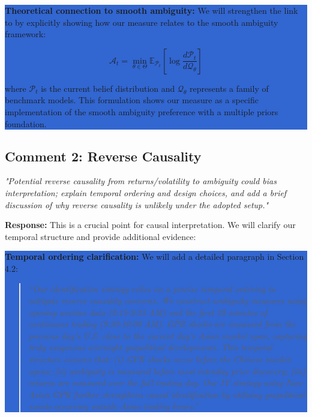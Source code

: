 \documentclass[12pt]{article}
\begin{document}
\colorbox{highlight}{\parbox{\dimexpr\linewidth-2\fboxsep}{%
\textbf{Theoretical connection to smooth ambiguity:} We will strengthen the link to \citet{Klibanoff2005} by explicitly showing how our measure relates to the smooth ambiguity framework:

\begin{equation}
\mathcal{A}_t = \min_{\theta \in \Theta} \mathbb{E}_{\mathcal{P}_t} \left[ \log \frac{d\mathcal{P}_t}{d\mathcal{Q}_\theta} \right]
\end{equation}

where $\mathcal{P}_t$ is the current belief distribution and $\mathcal{Q}_\theta$ represents a family of benchmark models. This formulation shows our measure as a specific implementation of the smooth ambiguity preference with a multiple priors foundation.
}}

\subsection*{Comment 2: Reverse Causality}
\textit{"Potential reverse causality from returns/volatility to ambiguity could bias interpretation; explain temporal ordering and design choices, and add a brief discussion of why reverse causality is unlikely under the adopted setup."}

\textbf{Response:} This is a crucial point for causal interpretation. We will clarify our temporal structure and provide additional evidence:

\colorbox{highlight}{\parbox{\dimexpr\linewidth-2\fboxsep}{%
\textbf{Temporal ordering clarification:} We will add a detailed paragraph in Section 4.2:

\begin{quote}
\textit{``Our identification strategy relies on a precise temporal ordering to mitigate reverse causality concerns. We construct ambiguity measures using opening auction data (9:15-9:25 AM) and the first 30 minutes of continuous trading (9:30-10:00 AM). GPR shocks are measured from the previous day's U.S. close to the current day's Asian market open, capturing truly exogenous overnight geopolitical developments. This temporal structure ensures that: (i) GPR shocks occur before the Chinese market opens; (ii) ambiguity is measured before most intraday price discovery; (iii) returns are measured over the full trading day. Our IV strategy using Non-Asian GPR further strengthens causal identification by utilizing geopolitical events occurring outside Asian trading hours.''}
\end{quote}
}}
\end{document}
